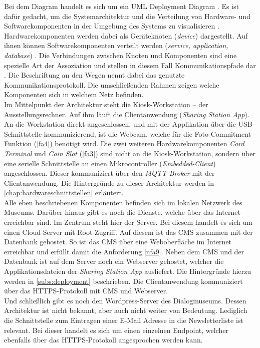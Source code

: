 Bei dem Diagram handelt es sich um ein UML Deployment Diagram \cite{uml-spec}. Es ist dafür 
gedacht, um die Systemarchitektur und die Verteilung von Hardware- und Softwarekomponenten in der 
Umgebung des Systems zu visualisieren \cite{uml-2.5}. Hardwarekomponenten werden dabei als Geräteknoten
(\emph{device}) dargestellt. Auf ihnen können Softwarekomponenten verteilt werden (\emph{service,
application, database}) \cite{uml-diagrams, uml-2.5}. Die Verbindungen zwischen Knoten und Komponenten
sind eine spezielle Art der Assoziation und stellen in diesem Fall Kommunikationspfade dar \cite{uml-2.5}.
Die Beschriftung an den Wegen nennt dabei das genutzte Kommunikationsprotokoll.
Die umschließenden Rahmen zeigen welche Komponenten sich in welchem Netz befinden.\\
Im Mittelpunkt der Architektur steht die Kiosk-Workstation -- der Ausstellungsrechner. Auf ihm läuft
die Clientanwendung (\emph{Sharing Station App}). An die Workstation direkt angeschlossen, und mit der
Applikation über die USB-Schnittstelle kommunizierend, ist die Webcam, 
welche für die Foto-Commitment Funktion (\ref{fa4}) benötigt wird. 
Die zwei weiteren Hardwarekomponenten \emph{Card Terminal} und \emph{Coin Slot} (\ref{fa3}) sind nicht 
an die Kiosk-Workstation, sondern über eine serielle Schnittstelle an einen
Mikrocontroller (\emph{Embedded-Client}) angeschlossen. Dieser kommuniziert über
den \emph{MQTT Broker} mit der Clientanwendung. Die Hintergründe zu dieser Architektur werden in
\autoref{chap:hardwareschnittstellen} erläutert.\\
Alle eben beschriebenen Komponenten befinden sich im lokalen Netzwerk des Museums. Darüber hinaus gibt 
es noch die Dienste, welche über das Internet erreichbar sind. Im Zentrum steht hier der Server. 
Bei diesem handelt es sich um einen Cloud-Server mit Root-Zugriff. Auf diesem ist das CMS zusammen mit
der Datenbank gehostet. So ist das CMS über eine Weboberfläche im Internet erreichbar und erfüllt
damit die Anforderung \ref{nfa9}. Neben dem CMS und der Datenbank ist auf dem Server noch ein
Webserver gehostet, welcher die Applikationsdateien der \emph{Sharing
Station App} ausliefert. Die Hintergründe hierzu werden in \autoref{subs:deployment} beschrieben.
Die Clientanwendung kommuniziert über das HTTPS-Protokoll mit CMS und Webserver.\\
Und schließlich gibt es noch den Wordpress-Server des Dialogmuseums. Dessen Architektur ist nicht bekannt,
aber auch nicht weiter von Bedeutung. Lediglich die Schnittstelle zum Eintragen einer E-Mail Adresse in 
die Newsletterliste ist relevant. Bei dieser handelt es sich um einen einzelnen Endpoint, welcher ebenfalls
über das HTTPS-Protokoll angesprochen werden kann. 